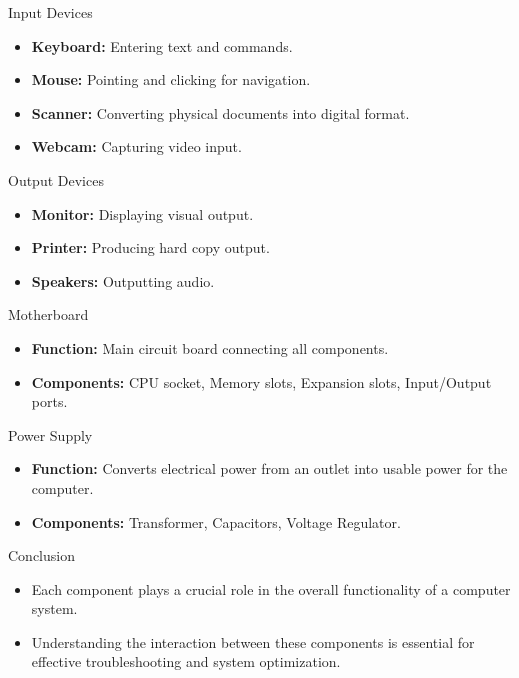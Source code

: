 \begin{frame}{Input Devices}
  \begin{itemize}
    \item \textbf{Keyboard:} Entering text and commands.
    \item \textbf{Mouse:} Pointing and clicking for navigation.
    \item \textbf{Scanner:} Converting physical documents into digital format.
    \item \textbf{Webcam:} Capturing video input.
  \end{itemize}
\end{frame}

\begin{frame}{Output Devices}
  \begin{itemize}
    \item \textbf{Monitor:} Displaying visual output.
    \item \textbf{Printer:} Producing hard copy output.
    \item \textbf{Speakers:} Outputting audio.
  \end{itemize}
\end{frame}

\begin{frame}{Motherboard}
  \begin{itemize}
    \item \textbf{Function:} Main circuit board connecting all components.
    \item \textbf{Components:} CPU socket, Memory slots, Expansion slots, Input/Output ports.
  \end{itemize}
\end{frame}

\begin{frame}{Power Supply}
  \begin{itemize}
    \item \textbf{Function:} Converts electrical power from an outlet into usable power for the computer.
    \item \textbf{Components:} Transformer, Capacitors, Voltage Regulator.
  \end{itemize}
\end{frame}

\begin{frame}{Conclusion}
  \begin{itemize}
    \item Each component plays a crucial role in the overall functionality of a computer system.
    \item Understanding the interaction between these components is essential for effective troubleshooting and system optimization.
  \end{itemize}
\end{frame}
